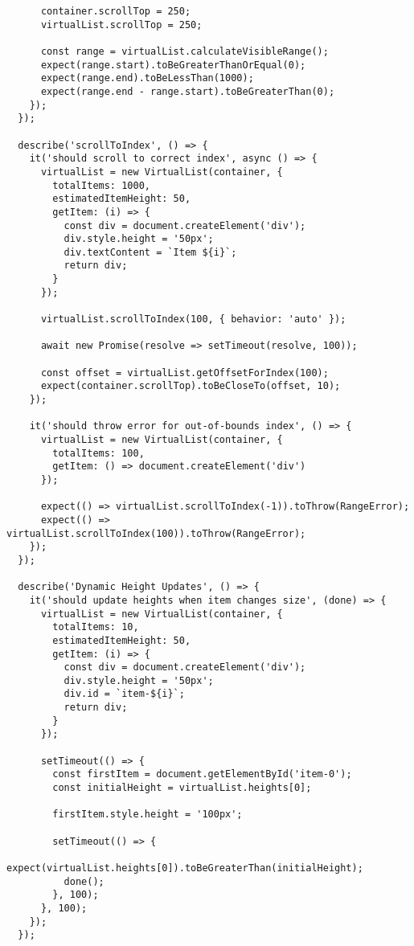 \documentclass[11pt]{article}
\begin{document}
\begin{verbatim}
      container.scrollTop = 250;
      virtualList.scrollTop = 250;
      
      const range = virtualList.calculateVisibleRange();
      expect(range.start).toBeGreaterThanOrEqual(0);
      expect(range.end).toBeLessThan(1000);
      expect(range.end - range.start).toBeGreaterThan(0);
    });
  });
  
  describe('scrollToIndex', () => {
    it('should scroll to correct index', async () => {
      virtualList = new VirtualList(container, {
        totalItems: 1000,
        estimatedItemHeight: 50,
        getItem: (i) => {
          const div = document.createElement('div');
          div.style.height = '50px';
          div.textContent = `Item ${i}`;
          return div;
        }
      });
      
      virtualList.scrollToIndex(100, { behavior: 'auto' });
      
      await new Promise(resolve => setTimeout(resolve, 100));
      
      const offset = virtualList.getOffsetForIndex(100);
      expect(container.scrollTop).toBeCloseTo(offset, 10);
    });
    
    it('should throw error for out-of-bounds index', () => {
      virtualList = new VirtualList(container, {
        totalItems: 100,
        getItem: () => document.createElement('div')
      });
      
      expect(() => virtualList.scrollToIndex(-1)).toThrow(RangeError);
      expect(() => virtualList.scrollToIndex(100)).toThrow(RangeError);
    });
  });
  
  describe('Dynamic Height Updates', () => {
    it('should update heights when item changes size', (done) => {
      virtualList = new VirtualList(container, {
        totalItems: 10,
        estimatedItemHeight: 50,
        getItem: (i) => {
          const div = document.createElement('div');
          div.style.height = '50px';
          div.id = `item-${i}`;
          return div;
        }
      });
      
      setTimeout(() => {
        const firstItem = document.getElementById('item-0');
        const initialHeight = virtualList.heights[0];
        
        firstItem.style.height = '100px';
        
        setTimeout(() => {
          expect(virtualList.heights[0]).toBeGreaterThan(initialHeight);
          done();
        }, 100);
      }, 100);
    });
  });
  

\end{verbatim}
\end{document}
